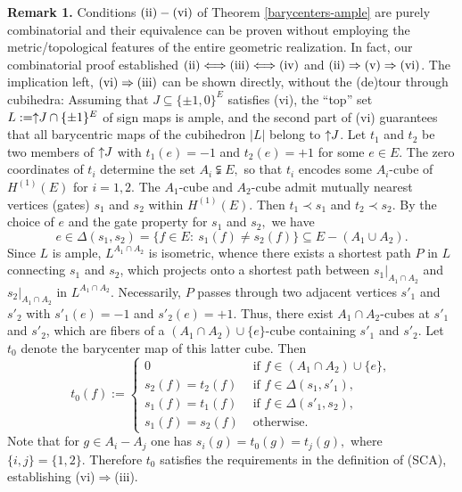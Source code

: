 \documentclass[11pt,a4paper]{amsart}
\theoremstyle{definition}
\numberwithin{equation}{section}
\newcommand{\covectors}{\ensuremath{L}}
\newcommand{\HH}{\ensuremath{H}}
\newcommand{\hcovectors}{J}
\begin{document}
\noindent
{\bf Remark 1.}
Conditions $\rm{(ii)}-\rm{(vi)}$ of Theorem \ref{barycenters-ample} are purely combinatorial and
their equivalence can be proven without employing the metric/topological features of the entire geometric realization. In fact, our combinatorial proof established $\rm{(ii)}\Longleftrightarrow\rm{(iii)}\Longleftrightarrow\rm{(iv)}$ and $\rm{(ii)}\Rightarrow\rm{(v)}\Rightarrow\rm{(vi)}$.
The implication left, $\rm{(vi)}\Rightarrow\rm{(iii)}$ can be shown directly,
without the (de)tour through cubihedra: Assuming that $\hcovectors\subseteq \{ \pm 1,0\}^E$ satisfies (vi), the ``top'' set $\covectors:=\uparrow\hspace*{-0.1cm}\hcovectors\cap \{ \pm 1\}^E$ of sign maps is ample, and the second part of (vi) guarantees that all barycentric maps of the cubihedron $|\covectors|$ belong to $\uparrow\hspace*{-0.1cm}\hcovectors$. Let $t_1$ and $t_2$ be two members of
$\uparrow\hspace*{-0.1cm}\hcovectors$ with $t_1(e)=-1$ and $t_2(e)=+1$ for some $e\in E$. The zero coordinates of $t_i$ determine the set $A_i\subsetneqq E,$ so that $t_i$ encodes some $A_i$-cube of $\HH^{(1)}(E)$ for $i=1,2.$ The $A_1$-cube and $A_2$-cube admit mutually nearest vertices (gates) $s_1$ and $s_2$ within $\HH^{(1)}(E)$. Then $t_1\prec s_1$ and $t_2\prec s_2.$ By the choice of $e$ and the gate property for $s_1$ and $s_2,$ we have
$$e\in \Delta (s_1,s_2)=\{ f\in E: ~s_1(f)\ne s_2(f)\}\subseteq E-(A_1\cup A_2).$$
Since $\covectors$ is ample, $\covectors^{A_1\cap A_2}$ is isometric, whence there exists a shortest path $P$ in $\covectors$
connecting $s_1$ and $s_2$, which projects onto a shortest path between $s_1|_{A_1\cap A_2}$ and $s_2|_{A_1\cap A_2}$
in $\covectors^{A_1\cap A_2}.$ Necessarily, $P$ passes through two adjacent vertices $s'_1$ and $s'_2$ with $s'_1(e)=-1$ and $s'_2(e)=+1.$
Thus, there exist $A_1\cap A_2$-cubes at $s'_1$ and $s'_2$, which are fibers of a $(A_1\cap A_2)\cup \{ e\}$-cube containing
$s'_1$ and $s'_2$. Let $t_0$ denote the barycenter map of this latter cube. Then
$$
t_0(f):=\begin{cases}
0 &\mbox{ if } f\in (A_1\cap A_2)\cup \{ e\},\\
s_2(f)=t_2(f) &\mbox{ if } f\in \Delta(s_1,s'_1),\\
s_1(f)=t_1(f) &\mbox{ if } f\in \Delta (s'_1,s_2),\\
s_1(f)=s_2(f) &\mbox{ otherwise. }
\end{cases}
$$
Note that for $g\in A_i-A_j$ one has $s_i(g)=t_0(g)=t_j(g),$ where $\{ i,j\}=\{ 1,2\}.$ Therefore $t_0$ satisfies the requirements in the definition of (SCA), establishing (vi)$\Rightarrow$(iii).
\end{document}
